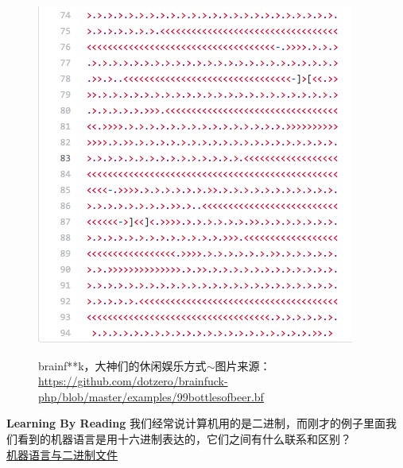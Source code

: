 \begin{figure}[htb]
\centering\includegraphics{image/brainfuck.png}\\
\caption{brainf**k，大神们的休闲娱乐方式$\sim$图片来源：\url{https://github.com/dotzero/brainfuck-php/blob/master/examples/99bottlesofbeer.bf}}\label{fig.brainfuck}
\end{figure}
\begin{paperbox}{\textbf{Learning By Reading}\starone}
我们经常说计算机用的是二进制，而刚才的例子里面我们看到的机器语言是用十六进制表达的，它们之间有什么联系和区别？\\
\href{https://stackoverflow.com/questions/21571709/difference-between-machine-language-binary-code-and-a-binary-file}{机器语言与二进制文件}
\end{paperbox}
